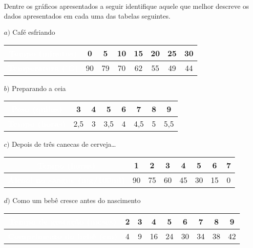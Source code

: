 \documentclass[10 pt,usenames,dvipsnames, oneside]{article}
\begin{document}
Dentre os gráficos apresentados a seguir identifique aquele que melhor descreve os dados apresentados em cada uma das tabelas seguintes.


\(a)\) Café esfriando
\begin{table}[H]
\centering
\begin{tabu} to \textwidth{|c|c|c|c|c|c|c|c|}
\hline
{}\textcolor{white}{\textbf{Tempo (minutos)}} & 0 & 5 & 10 & 15 & 20 & 25 & 30 \\
\hline
{}\textcolor{white}{\textbf{Temperatura ($^{\circ}$C)}} & 90 & 79 & 70 & 62 & 55 & 49 & 44\\
\hline
\end{tabu}
\end{table}

\(b)\) Preparando a ceia

\begin{table}[H]
\centering
\begin{tabu} to \textwidth{|c|c|c|c|c|c|c|c|}
\hline
{}\textcolor{white}{\textbf{Peso (quilos)}} & 3 & 4 & 5 & 6 & 7 & 8 & 9 \\
\hline
{}\textcolor{white}{\textbf{Tempo (horas)}} & 2,5 & 3 & 3,5 & 4 & 4,5 & 5 & 5,5\\
\hline
\end{tabu}
\end{table}

\(c)\) Depois de três canecas de cerveja…

\begin{table}[H]
\centering
\begin{tabu} to \textwidth{|c|c|c|c|c|c|c|c|}
\hline
{}\textcolor{white}{\textbf{Tempo (horas)}} & 1 & 2 & 3 & 4 & 5 & 6 & 7 \\
\hline
{}\textcolor{white}{\textbf{Álcool no sangue (mg/100ml)}} & 90 & 75 & 60 & 45 & 30 & 15 & 0 \\
\hline
\end{tabu}
\end{table}

\(d)\) Como um bebê cresce antes do nascimento

\begin{table}[H]
\centering
\begin{tabu} to \textwidth{|c|c|c|c|c|c|c|c|c|}
\hline
{}\textcolor{white}{\textbf{Tempo de gestação (meses)}} & 2 & 3 & 4 & 5 & 6 & 7 & 8 & 9 \\
\hline
{}\textcolor{white}{\textbf{Comprimento do bebê (cm)}} & 4 & 9 & 16 & 24 & 30 & 34 & 38 & 42 \\
\hline
\end{tabu}
\end{table}
\end{document}
